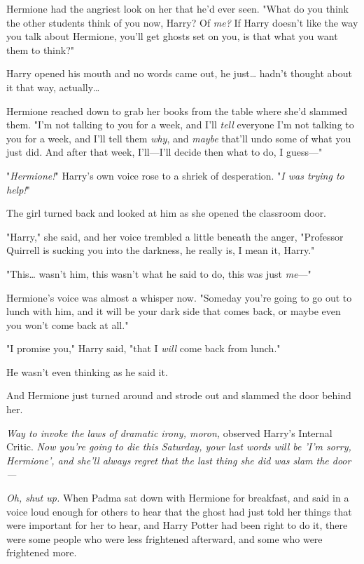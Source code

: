 Hermione had the angriest look on her that he'd ever seen. "What do you think 
the other students think of you now, Harry? Of \emph{me?} If Harry doesn't like 
the way you talk about Hermione, you'll get ghosts set on you, is that what you 
want them to think?"

Harry opened his mouth and no words came out, he just{\ldots} hadn't thought 
about it that way, actually{\ldots}

Hermione reached down to grab her books from the table where she'd slammed 
them. "I'm not talking to you for a week, and I'll \emph{tell} everyone I'm not 
talking to you for a week, and I'll tell them \emph{why}, and \emph{maybe} 
that'll undo some of what you just did. And after that week, I'll---I'll decide 
then what to do, I guess---"

"\emph{Hermione!}" Harry's own voice rose to a shriek of desperation. "\emph{I 
was trying to help!}"

The girl turned back and looked at him as she opened the classroom door.

"Harry," she said, and her voice trembled a little beneath the anger, 
"Professor Quirrell is sucking you into the darkness, he really is, I mean it, 
Harry."

"This{\ldots} wasn't him, this wasn't what he said to do, this was just 
\emph{me}---"

Hermione's voice was almost a whisper now. "Someday you're going to go out to 
lunch with him, and it will be your dark side that comes back, or maybe even 
you won't come back at all."

"I promise you," Harry said, "that I \emph{will} come back from lunch."

He wasn't even thinking as he said it.

And Hermione just turned around and strode out and slammed the door behind her.

\emph{Way to invoke the laws of dramatic irony, moron,} observed Harry's 
Internal Critic. \emph{Now you're going to die this Saturday, your last words 
will be 'I'm sorry, Hermione', and she'll always regret that the last thing she 
did was slam the door---}

\emph{Oh, shut up.}
\sbreak
When Padma sat down with Hermione for breakfast, and said in a voice loud 
enough for others to hear that the ghost had just told her things that were 
important for her to hear, and Harry Potter had been right to do it, there were 
some people who were less frightened afterward, and some who were frightened 
more.

